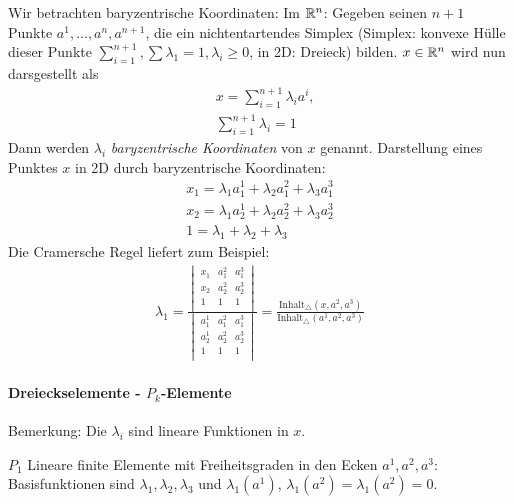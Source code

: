 Wir betrachten baryzentrische Koordinaten: Im $\mathbb{R}^n$: Gegeben seinen $n+1$ Punkte $a^1, \dots, a^n, a^{n+1}$, die ein nichtentartendes Simplex (Simplex: konvexe Hülle dieser Punkte $\sum_{i = 1}^{n+1}, \sum \lambda_1 = 1, \lambda_i \geq 0$, in 2D: Dreieck) bilden. $x \in \mathbb{R}^n$ wird nun darsgestellt als 
\begin{align*}
  & x = \sum_{i = 1}^{n+1} \lambda_ia^i, \\
& \sum_{i = 1}^{n+1} \lambda_i = 1
\end{align*}
Dann werden $\lambda_i$ \emph{baryzentrische Koordinaten} von $x$ genannt.
Darstellung eines Punktes $x$ in 2D durch baryzentrische Koordinaten:
\begin{align*}
  x_1 = \lambda_1 a^1_1 + \lambda_2 a_1^2 + \lambda_3 a_1^3\\
  x_2 = \lambda_1 a^1_2 + \lambda_2 a_2^2 + \lambda_3 a_2^3\\
  1 = \lambda_1 + \lambda_2 + \lambda_3
\end{align*}
Die Cramersche Regel liefert zum Beispiel:
\begin{align*}
  \lambda_1 = \frac{
    \begin{vmatrix}
      x_1 & a_1^2 & a_1^3\\
      x_2 & a_2^2 & a_2^3\\      
      1 & 1 & 1\\
    \end{vmatrix}
}{
    \begin{vmatrix}
      a_1^1 & a_1^2 & a_1^3\\
      a_2^1 & a_2^2 & a_2^3\\      
      1 & 1 & 1\\
    \end{vmatrix}
} = \frac{\text{Inhalt}_\triangle (x, a^2, a^3)}{\text{Inhalt}_\triangle (a^1, a^2, a^3)}
\end{align*}

\paragraph{Dreieckselemente - $P_k$-Elemente}
Bemerkung: Die $\lambda_i$ sind lineare Funktionen in $x$. 

$P_1$ Lineare finite Elemente mit Freiheitsgraden in den Ecken $a^1, a^2, a^3$: Basisfunktionen sind $\lambda_1, \lambda_2, \lambda_3$ und $\lambda_1(a^1)$, $\lambda_1(a^2) = \lambda_1(a^2) = 0$. 

